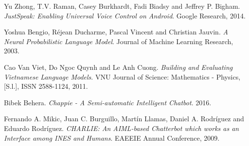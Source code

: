 \documentclass[12pt]{report}
\begin{document}
\begin{thebibliography}{9}
Yu Zhong, T.V. Raman, Casey Burkhardt, Fadi Biadsy and Jeffrey P. Bigham. 
\textit{JustSpeak: Enabling Universal Voice Control on Android}. 
Google Research, 2014.

Yoshua Bengio, Réjean Ducharme, Pascal Vincent and Christian Jauvin. 
\textit{A Neural Probabilistic Language Model}. 
Journal of Machine Learning Research, 2003.

Cao Van Viet, Do Ngoc Quynh and Le Anh Cuong. 
\textit{Building and Evaluating Vietnamese Language Models}. 
VNU Journal of Science: Mathematics - Physics, [S.l.], ISSN 2588-1124, 2011.

Bibek Behera. 
\textit{Chappie - A Semi-automatic Intelligent Chatbot}. 
2016.

Fernando A. Mikic, Juan C. Burguillo, Martín Llamas, Daniel A. Rodríguez and Eduardo Rodríguez. 
\textit{CHARLIE: An AIML-based Chatterbot which works as an Interface among INES and Humans}. 
EAEEIE Annual Conference, 2009.

\end{thebibliography}

\end{document}
